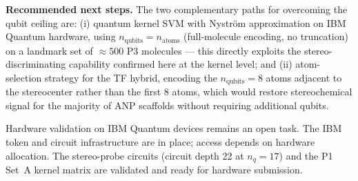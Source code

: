 \textbf{Recommended next steps.}
The two complementary paths for overcoming the qubit ceiling are:
(i) quantum kernel SVM with Nystr\"{o}m approximation on IBM Quantum hardware,
using $n_{\text{qubits}} = n_{\text{atoms}}$ (full-molecule encoding, no truncation)
on a landmark set of $\approx 500$ P3 molecules --- this directly exploits the
stereo-discriminating capability confirmed here at the kernel level; and
(ii) atom-selection strategy for the TF hybrid, encoding the
$n_{\text{qubits}} = 8$ atoms adjacent to the stereocenter rather than the
first 8 atoms, which would restore stereochemical signal for the majority
of ANP scaffolds without requiring additional qubits.

Hardware validation on IBM Quantum devices remains an open task. The IBM
token and circuit infrastructure are in place; access depends on hardware
allocation. The stereo-probe circuits (circuit depth 22 at $n_q = 17$) and
the P1 Set~A kernel matrix are validated and ready for hardware submission.

